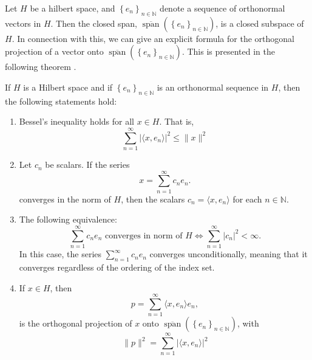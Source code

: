 Let $H$ be a hilbert space, and $\left\{ e_{n} \right\}_{n\in \mathbb{N}}$ denote a sequence of orthonormal vectors in $H$. Then the closed span, $\overline{\operatorname{span}}\left( \left\{ e_{n} \right\}_{n\in \mathbb{N}} \right)$, is a closed subspace of $H$. In connection with this, we can give an explicit formula for the orthogonal projection of a vector onto $\overline{\operatorname{span}}\left( \left\{ e_{n} \right\}_{n\in \mathbb{N}} \right)$. This is presented in the following theorem \cite[p.~210]{heilMetricsNormsInner2018}.
%
%
\begin{theorem}\label{thrm:orthog_proj_formula_and_facts}
    If $H$ is a Hilbert space and if $\left\{ e_{n} \right\}_{n\in \mathbb{N}}$ is an orthonormal sequence in $H$,  then the following statements hold:
    \begin{enumerate}[label=(\alph*)]
        \item \label{eq:opfaf_a} Bessel's inequality holds for all $x \in H$. That is, 
        \begin{equation}
            \sum_{n=1}^{\infty} \left| \langle x, e_n \rangle \right|^2 \leq \| x\|^2 
        \end{equation}
        
        \item \label{eq:opfaf:b} Let $c_n$ be scalars. If the series $$ x=\sum_{n=1}^\infty c_n e_n.$$ converges in the norm of $H$, then the scalars $c_n= \langle x, e_n\rangle$ for each $n \in \mathbb{N}$.
        
        \item \label{eq:opfaf_c} The following equivalence: 
        \begin{equation}
            \sum_{n=1}^{\infty} c_n e_n \text{ converges in norm of } H \Longleftrightarrow \sum_{n=1}^{\infty} \left| c_n \right|^2 < \infty.
        \end{equation}
        In this case, the series $\sum_{n=1}^{\infty} c_n e_n$ converges unconditionally, meaning that it converges regardless of the ordering of the index set.
        
        \item \label{eq:opfaf_d} If $x \in H$, then 
        \begin{equation} 
            p= \sum_{n=1}^{\infty} \langle x, e_n \rangle e_n, 
        \end{equation} 
        is the orthogonal projection of $x$ onto  $\overline{\operatorname{span}} \left( \left\{ e_{n} \right\}_{n\in \mathbb{N}} \right) $, with
        \begin{equation}
            \| p\|^2 = \sum_{n=1}^{\infty} \left| \langle x,e_n \rangle \right|^2
        \end{equation}
        

\end{enumerate}
\end{theorem}
